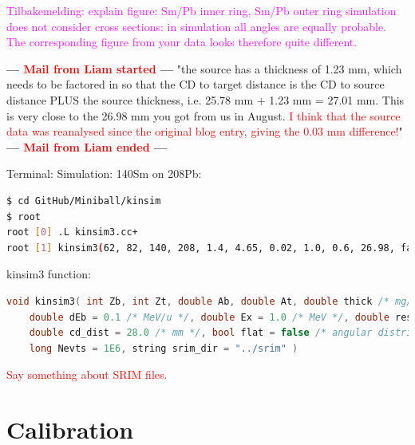 \documentclass[twoside,english]{uiofysmaster/uiofysmaster}
\begin{document}
\textcolor{Magenta}{Tilbakemelding: \newline 
explain figure: Sm/Pb inner ring, Sm/Pb outer ring \newline
simulation does not consider cross sections: in simulation all angles are equally probable. The corresponding figure from your data looks therefore quite different.
}


\textbf{--- \textcolor{red}{Mail from Liam started} ---} \newline
"the source has a thickness of 1.23 mm, which needs to be factored in so that the CD to target distance is the CD to source distance PLUS the source thickness, i.e. 25.78 mm + 1.23 mm =  27.01 mm. 
This is very close to the 26.98 mm you got from us in August. 
\textcolor{red}{I think that the source data was reanalysed since the original blog entry, giving the 0.03 mm difference!}" \newline
\textbf{--- \textcolor{red}{Mail from Liam ended} ---} \newline


Terminal: Simulation: 140Sm on 208Pb:
\begin{lstlisting}[language=sh]
$ cd GitHub/Miniball/kinsim
$ root
root [0] .L kinsim3.cc+
root [1] kinsim3(62, 82, 140, 208, 1.4, 4.65, 0.02, 1.0, 0.6, 26.98, false, 1e6, "../SRIM")
\end{lstlisting}


kinsim3 function:
\begin{lstlisting}[language=c++]
void kinsim3( int Zb, int Zt, double Ab, double At, double thick /* mg/cm^2 */, double Eb /* MeV/u */,
    double dEb = 0.1 /* MeV/u */, double Ex = 1.0 /* MeV */, double res = 0.6 /* % */,
	double cd_dist = 28.0 /* mm */, bool flat = false /* angular distribution? */,
	long Nevts = 1E6, string srim_dir = "../srim" )
\end{lstlisting}

\bigskip

\textcolor{red}{Say something about SRIM files.}

\bigskip



\section{Calibration}
\end{document}
